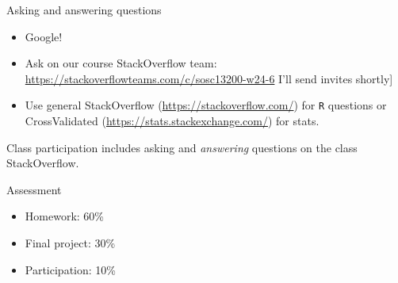 \documentclass[xcolor={dvipsnames}]{beamer}
\begin{document}
\begin{frame}{Asking and answering questions}

\begin{itemize}
\item Google! \pause
\item Ask on our course StackOverflow team: \url{https://stackoverflowteams.com/c/sosc13200-w24-6} \pause {[}I'll send invites shortly{]}  \pause
\item Use general StackOverflow (\url{https://stackoverflow.com/}) for \texttt{R} questions or CrossValidated (\url{https://stats.stackexchange.com/}) for stats. \pause
\end{itemize}

Class participation includes asking and \textit{answering} questions on the class StackOverflow.

\end{frame}




\begin{frame}{Assessment}

\begin{itemize}
\item Homework: 60\%
\item Final project: 30\%
\item Participation: 10\%
\end{itemize}

\end{frame}



\end{document}
